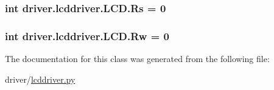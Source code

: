\subsubsection[{Rs}]{\setlength{\rightskip}{0pt plus 5cm}int driver.\+lcddriver.\+L\+C\+D.\+Rs = 0\hspace{0.3cm}{\ttfamily [static]}}\label{classdriver_1_1lcddriver_1_1LCD_a99b7db0cf5e9abd67898c5b63df45036}
\hypertarget{classdriver_1_1lcddriver_1_1LCD_acd0d0ce3f9b3aa9d0a0c71c4436035e5}{}
\subsubsection[{Rw}]{\setlength{\rightskip}{0pt plus 5cm}int driver.\+lcddriver.\+L\+C\+D.\+Rw = 0\hspace{0.3cm}{\ttfamily [static]}}\label{classdriver_1_1lcddriver_1_1LCD_acd0d0ce3f9b3aa9d0a0c71c4436035e5}


The documentation for this class was generated from the following file\+:\begin{DoxyCompactItemize}
\item 
driver/\hyperlink{lcddriver_8py}{lcddriver.\+py}\end{DoxyCompactItemize}
